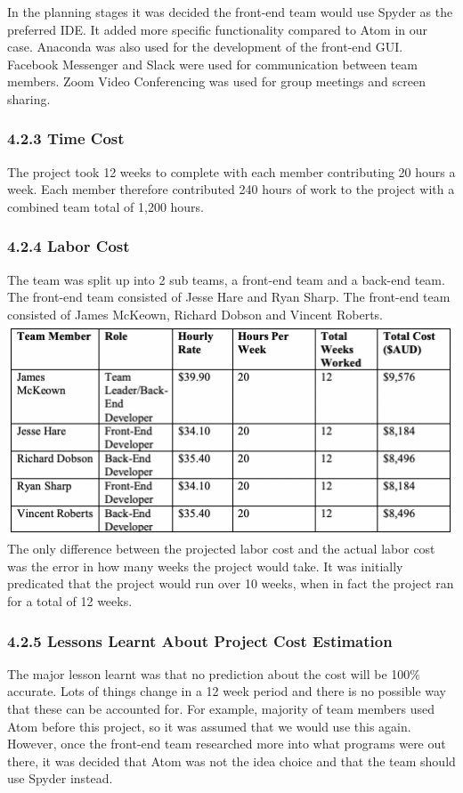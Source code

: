 \documentclass[11pt]{article}
\begin{document}
In the planning stages it was decided the front-end team would use Spyder as the preferred IDE. It added more specific functionality compared to Atom in our case. Anaconda was also used for the development of the front-end GUI. Facebook Messenger and Slack were used for communication between team members. Zoom Video Conferencing was used for group meetings and screen sharing. \\



\subsubsection{4.2.3 Time Cost}
The project took 12 weeks to complete with each member contributing 20 hours a week. Each member therefore contributed 240 hours of work to the project with a combined team total of 1,200 hours.

\subsubsection{4.2.4 Labor Cost}
The team was split up into 2 sub teams, a front-end team and a back-end team. The front-end team consisted of Jesse Hare and Ryan Sharp. The front-end team consisted of James McKeown, Richard Dobson and Vincent Roberts. \\

\includegraphics[scale=0.71]{team_cost.png} \\

The only difference between the projected labor cost and the actual labor cost was the error in how many weeks the project would take. It was initially predicated that the project would run over 10 weeks, when in fact the project ran for a total of 12 weeks.

\subsubsection{4.2.5 Lessons Learnt About Project Cost Estimation}
The major lesson learnt was that no prediction about the cost will be 100\% accurate. Lots of things change in a 12 week period and there is no possible way that these can be accounted for. For example, majority of team members used Atom before this project, so it was assumed that we would use this again. However, once the front-end team researched more into what programs were out there, it was decided that Atom was not the idea choice and that the team should use Spyder instead.
\end{document}
